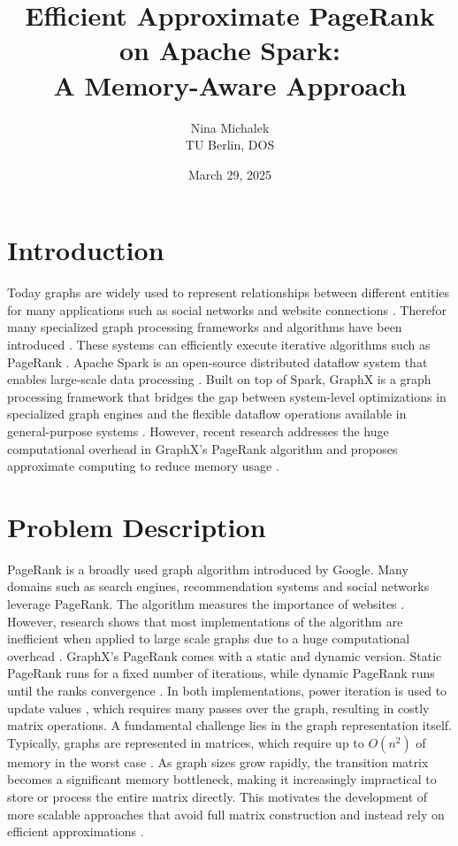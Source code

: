 \documentclass[a4paper,12pt]{article}
\title{Efficient Approximate PageRank on Apache Spark: \\ A Memory-Aware Approach}
\author{Nina Michalek\\TU Berlin, DOS}
\date{March 29, 2025}
\begin{document}
\maketitle

\begin{multicols}{2}

\section{Introduction}
Today graphs are widely used to represent relationships between different entities for many applications such as social networks and website connections \cite{zhang_distributed_2021}. Therefor many specialized graph processing frameworks and algorithms have been introduced \cite{meng_survey_2024}. These systems can efficiently execute iterative algorithms such as PageRank \cite{gonzalez_graphx_nodate}. Apache Spark is an open-source distributed dataflow system that enables large-scale data processing \cite{shanahan_large_2015}. Built on top of Spark, GraphX is a graph processing framework that bridges the gap between system-level optimizations in specialized graph engines and the flexible dataflow operations available in general-purpose systems \cite{gonzalez_graphx_nodate}. However, recent research addresses the huge computational overhead in GraphX's PageRank algorithm and proposes approximate computing to reduce memory usage \cite{wu_efficient_2024}. 
 

\section{Problem Description}
PageRank is a broadly used graph algorithm introduced by Google. Many domains such as search engines, recommendation systems and social networks leverage PageRank. The algorithm measures the importance of websites \cite{wu_efficient_2024}. However, research shows that most implementations of the algorithm are inefficient when applied to large scale graphs due to a huge computational overhead \cite{wu_efficient_2024}\cite{jayaram_dynamic_2024}\cite{yang_efficient_2024}. GraphX's PageRank comes with a static and dynamic version. Static PageRank runs for a fixed number of iterations, while dynamic PageRank runs until the ranks convergence \cite{noauthor_graphx_nodate}. In both implementations, power iteration is used to update values \cite{xin_graphx_2013}, which requires many passes over the graph, resulting in costly matrix operations.  A fundamental challenge lies in the graph representation itself. Typically, graphs are represented in matrices, which require up to $O(n^2)$ of memory in the worst case \cite{wu_efficient_2024}. As graph sizes grow rapidly, the transition matrix becomes a significant memory bottleneck, making it increasingly impractical to store or process the entire matrix directly. This motivates the development of more scalable approaches that avoid full matrix construction and instead rely on efficient approximations \cite{meng_survey_2024}.




\end{multicols}
\end{document}
